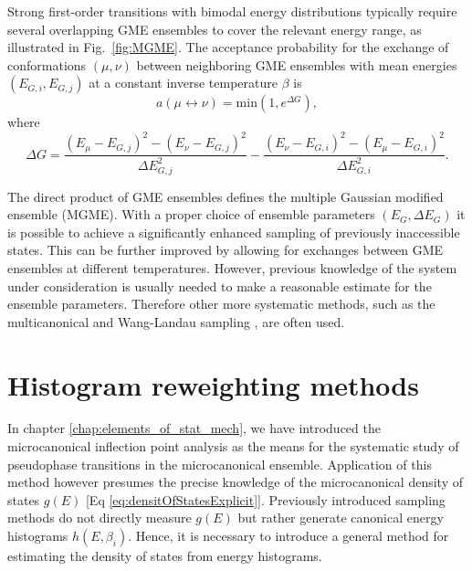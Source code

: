 \documentclass[12pt]{report}
\begin{document}
Strong first-order transitions with bimodal energy distributions typically
require several overlapping GME ensembles to cover the relevant energy range, as illustrated in Fig.~\ref{fig:MGME}. The acceptance probability for the
exchange of conformations $(\mu,\nu)$ between neighboring GME ensembles with mean energies $(E_{G,i}, E_{G,j})$ at a constant inverse temperature $\beta$ is
%
\begin{equation}
a\left(\mu \leftrightarrow \nu \right) = 	
\mathrm{min}\left(1,e^{\Delta G}\right),
\end{equation}
%
where
\begin{equation}
\Delta G  = 
\frac{\left(E_{\mu} - E_{G,j}\right)^{2}-\left(E_{\nu}-
E_{G,j}\right)^{2}}{\Delta E_{G,j}^{2}} - \frac{\left(E_{\nu} - 	
E_{G,i}\right)^{2}-\left(E_{\mu} - E_{G,i}\right)^{2}}{\Delta E_{G,i}^{2}}.
\end{equation}

The direct product of GME ensembles defines the multiple Gaussian modified ensemble (MGME). With a proper choice of ensemble parameters $(E_{G},\Delta E_{G})$ it is possible to achieve a significantly enhanced sampling of previously inaccessible states. This can be further improved by allowing for exchanges between GME ensembles at different temperatures. However, previous knowledge of the system under consideration is usually needed to make a reasonable estimate for the ensemble parameters. Therefore other more systematic methods, such as the multicanonical \cite{muca1a,muca1b,muca2,muca3,muca4,Bachmann2013} and Wang-Landau sampling \cite{wl1,wl2,wl3}, are often used.    

\section{Histogram reweighting methods}

In chapter \ref{chap:elements_of_stat_mech}, we have introduced the microcanonical inflection point analysis as the means for the systematic study of pseudophase transitions in the microcanonical ensemble. Application of this method however presumes the precise knowledge of the microcanonical density of states $g(E)$ [Eq \ref{eq:densitOfStatesExplicit}]. Previously introduced sampling methods do not directly measure $g(E)$ but rather generate canonical energy histograms $h(E,\beta_{i})$. Hence, it is necessary to introduce a general method for estimating the density of states from energy histograms.
\end{document}
